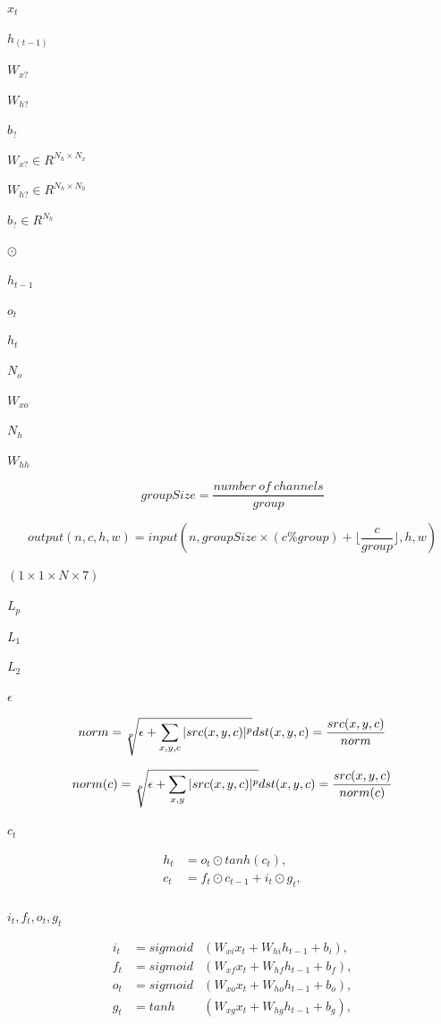 \documentclass{article}
\begin{document}
$x_t$
\pagebreak

$h_{(t-1)}$
\pagebreak

$W_{x?}$
\pagebreak

$W_{h?}$
\pagebreak

$b_{?}$
\pagebreak

$W_{x?} \in R^{N_h \times N_x}$
\pagebreak

$W_{h?} \in R^{N_h \times N_h}$
\pagebreak

$b_? \in R^{N_h}$
\pagebreak

$\odot$
\pagebreak

$h_{t-1}$
\pagebreak

$o_t$
\pagebreak

$h_t$
\pagebreak

$N_o$
\pagebreak

$ W_{xo} $
\pagebreak

$N_h$
\pagebreak

$ W_{hh} $
\pagebreak

\[ groupSize = \frac{number\ of\ channels}{group} \]
\pagebreak

\[ output(n, c, h, w) = input(n, groupSize \times (c \% group) + \lfloor \frac{c}{group} \rfloor, h, w) \]
\pagebreak

$ (1 \times 1 \times N \times 7) $
\pagebreak

$ L_p $
\pagebreak

$ L_1 $
\pagebreak

$ L_2 $
\pagebreak

$ \epsilon $
\pagebreak

\[norm = \sqrt[p]{\epsilon + \sum_{x, y, c} |src(x, y, c)|^p } \\
dst(x, y, c) = \frac{ src(x, y, c) }{norm}
\]
\pagebreak

\[norm(c) = \sqrt[p]{\epsilon + \sum_{x, y} |src(x, y, c)|^p } \\
dst(x, y, c) = \frac{ src(x, y, c) }{norm(c)}
\]
\pagebreak

$c_t$
\pagebreak

\begin{eqnarray*}h_t &= o_t \odot tanh(c_t),               \\
c_t &= f_t \odot c_{t-1} + i_t \odot g_t, \\
\end{eqnarray*}
\pagebreak

$i_t, f_t, o_t, g_t$
\pagebreak

\begin{eqnarray*}i_t &= sigmoid&(W_{xi} x_t + W_{hi} h_{t-1} + b_i), \\
f_t &= sigmoid&(W_{xf} x_t + W_{hf} h_{t-1} + b_f), \\
o_t &= sigmoid&(W_{xo} x_t + W_{ho} h_{t-1} + b_o), \\
g_t &= tanh   &(W_{xg} x_t + W_{hg} h_{t-1} + b_g), \\
\end{eqnarray*}
\pagebreak
\end{document}
